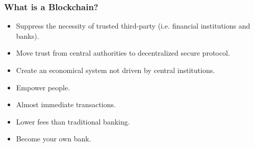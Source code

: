 \documentclass[notitlepage, usenames,dvipsnames]{beamer}
\begin{document}
    \begin{frame}
        \frametitle{What is a Blockchain?}

        \begin{overlayarea}{\textwidth}{\textheight}

            \vspace{4ex}

             {
            }

             {
            \vspace{4ex}
            \begin{itemize}
                \item \alert{Suppress} the necessity of trusted third-party (i.e. financial institutions and banks).
                \item Move trust from central authorities to decentralized secure protocol.
                \item Create an economical system not driven by central institutions.
                \item \alert{Empower} people.
                \item Almost \alert{immediate} transactions.
                \item Lower fees than traditional banking.
                \item Become your own bank.
            \end{itemize}

            }

        \end{overlayarea}
    \end{frame}
\end{document}
